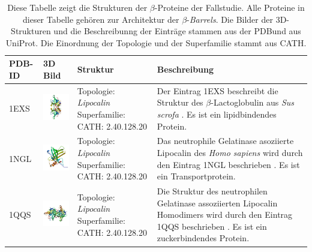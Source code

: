 \documentclass{report}
\begin{document}
\begin{table}
\begin{center}
\caption{Diese Tabelle zeigt die Strukturen der $\beta$-Proteine der Fallstudie. Alle Proteine in dieser Tabelle geh\"oren zur Architektur der $\beta$-\textit{Barrels}. Die Bilder der 3D-Strukturen und die Beschreibunng der Eintr\"age stammen aus der PDBund aus UniProt. Die Einordnung der Topologie und der Superfamilie stammt aus CATH. }
\begin{tabular}{ | C{9mm} | C{30mm} | C{29mm} | C{38mm} | }
\hline
PDB-ID & 3D Bild & Struktur & Beschreibung \\ \hline
1EXS  & \includegraphics[width=30mm, trim= -10 -5 -5 -10]{1EXS_bio_r_500.jpg} & Topologie: \newline \textit{Lipocalin} \newline Superfamilie: CATH: 2.40.128.20 & Der Eintrag 1EXS beschreibt die Struktur des $\beta$-Lactoglobulin aus \textit{Sus scrofa} \cite{1exs}. Es ist ein lipidbindendes Protein. \\ \hline
1NGL  & \includegraphics[width=30mm, trim= -10 -5 -5 -10]{1NGL_asym_r_500.jpg} & Topologie: \newline \textit{Lipocalin} \newline Superfamilie: CATH: 2.40.128.20  & Das neutrophile Gelatinase asoziierte Lipocalin des \textit{Homo sapiens} wird durch den Eintrag 1NGL beschrieben \cite{1ngl}. Es ist ein Transportprotein. \\ \hline
1QQS  & \includegraphics[width=30mm, trim= -10 -5 -5 -10]{1QQS_bio_r_500.jpg} & Topologie: \newline \textit{Lipocalin} \newline Superfamilie: CATH: 2.40.128.20  & Die Struktur des neutrophilen Gelatinase assoziierten Lipocalin Homodimers wird durch den Eintrag 1QQS beschrieben \cite{1qqs}. Es ist ein zuckerbindendes Protein.  \\ \hline

\end{tabular}
\end{center}
\end{table}
\end{document}
